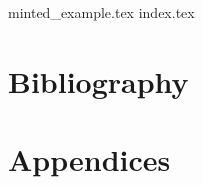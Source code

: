 \documentclass[twoside]{report}
\begin{document}
\pagestyle{empty} %


\cleardoublepage
%
\cleardoublepage
%
\cleardoublepage
{}
\pagestyle{fancy} %

\setcounter{tocdepth}{1}
\tableofcontents

\pagebreak


{minted_example.tex}
{index.tex}



\begingroup
	\part{Bibliography}
	
	\renewcommand{\addcontentsline}[3]{}%
	\renewcommand{\section}[2]{}%
	\renewcommand{\chapter}[2]{}%
	
	\label{biblo:mybiblio}
\endgroup

\appendix
	\part{Appendices}

\end{document}
